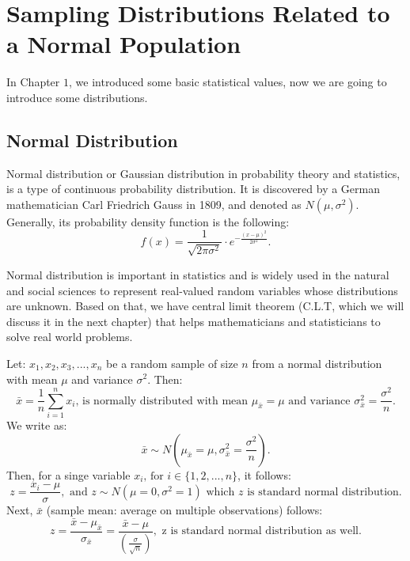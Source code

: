 \chapter{Sampling Distributions Related to a Normal Population}
\label{sec.matrix}
\pagestyle{myheadings}  

In Chapter $1$, we introduced some basic statistical values, now we are going to introduce some distributions.

\section{Normal Distribution}

Normal distribution or Gaussian distribution in probability theory and statistics, is a type of continuous probability distribution. It is discovered by a German mathematician Carl Friedrich Gauss in 1809, and denoted as $N(\mu, \sigma^{2})$. Generally, its probability density function is the following: \[ f(x) = \frac{1}{\sqrt{2 \pi \sigma^{2}}} \cdot e^{-\frac{(x - \mu)^{2}}{2 \sigma^{2}}}.\]

\noindent
Normal distribution is important in statistics and is widely used in the natural and social sciences to represent real-valued random variables whose distributions are unknown. Based on that, we have central limit theorem (C.L.T, which we will discuss it in the next chapter) that helps mathematicians and statisticians to solve real world problems.

\begin{definition}
Let: $x_1, x_2, x_3, ..., x_n$ be a random sample of size $n$ from a normal distribution with mean $\mu$ and variance $\sigma^{2}$. Then: \[ \bar{x} = \frac{1}{n} \sum_{i = 1}^{n}x_i \text{, is normally distributed with mean $\mu_{\bar{x}} = \mu \text{ and variance } \sigma^{2}_{\bar{x}} = \frac{\sigma^{2}}{n}$.}\] We write as: \[ \bar{x} \sim N(\mu_{\bar{x}} = \mu, \sigma^{2}_{\bar{x}} = \frac{\sigma^{2}}{n}).\] Then, for a singe variable $x_i \text{, for $i \in \{1, 2, ..., n\}$}$, it follows: \[ z = \frac{x_i - \mu}{\sigma}, \text{ and } z \sim N(\mu = 0, \sigma^{2} = 1) \text{ which $z$ is standard normal distribution}.\] Next,  $\bar{x}$ (sample mean: average on multiple observations) follows: \[ z = \frac{\bar{x} - \mu_{\bar{x}}}{\sigma_{\bar{x}}} = \frac{\bar{x} - \mu}{(\frac{\sigma}{\sqrt{n}})}, \text{ z is standard normal distribution as well.}\]
\end{definition}

